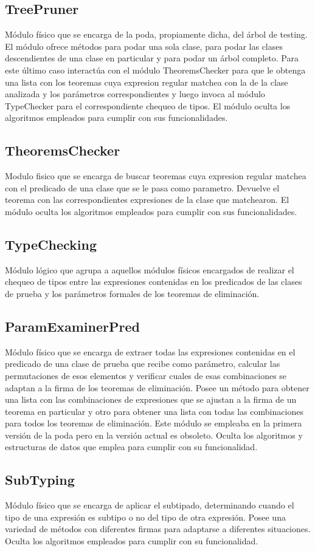 \documentclass[a4paper,10pt]{report}
\begin{document}
		\subsection{TreePruner}
		Módulo físico que se encarga de la poda, propiamente dicha, del árbol de testing. El módulo ofrece métodos para podar una sola clase, para podar las clases descendientes de una clase en particular y para podar un árbol completo. Para este último caso interactúa con el módulo TheoremsChecker para que le obtenga una lista con los teoremas cuya expresion regular matchea con la de la clase analizada y los parámetros correspondientes y luego invoca al módulo TypeChecker para el correspondiente chequeo de tipos. 
		El módulo oculta los algoritmos empleados para cumplir con sus funcionalidades.
		\subsection{TheoremsChecker}
		Modulo fisico que se encarga de buscar teoremas cuya expresion regular matchea con el predicado de una clase que se le pasa como parametro. Devuelve el teorema con las correspondientes expresiones de la clase que matchearon.
		El módulo oculta los algoritmos empleados para cumplir con sus funcionalidades.
		\subsection{TypeChecking}
		Módulo lógico que agrupa a aquellos módulos físicos encargados de realizar el chequeo de tipos entre las expresiones contenidas en los predicados de las clases de prueba y los parámetros formales de los teoremas de eliminación.
			\subsection{ParamExaminerPred}
			Módulo físico que se encarga de extraer todas las expresiones contenidas en el predicado de una clase de prueba que recibe como parámetro, calcular las permutaciones de esos elementos y verificar cuales de esas combinaciones se adaptan a la firma de los teoremas de eliminación. Posee un método para obtener una lista con las combinaciones de expresiones que se ajustan a la firma de un teorema en particular y otro para obtener una lista con todas las combinaciones para todos los teoremas de eliminación.
			Este módulo se empleaba en la primera versión de la poda pero en la versión actual es obsoleto.
			Oculta los algoritmos y estructuras de datos que emplea para cumplir con su funcionalidad.
			\subsection{SubTyping}
			Módulo físico que se encarga de aplicar el subtipado, determinando cuando el tipo de una expresión es subtipo o no del tipo de otra expresión. Posee una variedad de métodos con diferentes firmas para adaptarse a diferentes situaciones.
			Oculta los algoritmos empleados para cumplir con su funcionalidad.
\end{document}
